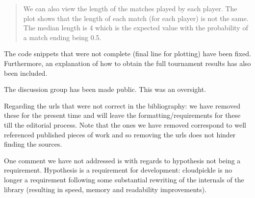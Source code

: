 \documentclass{article}
\begin{document}
\begin{quote}
    We can also view the length of the matches played by each player. The plot
    shows that the length of each match (for each player) is not the same. The
    median length is 4 which is the expected value with the probability of a
    match ending being 0.5.
\end{quote}

The code snippets that were not complete (final line for plotting) have been
fixed. Furthermore, an explanation of how to obtain the full tournament results
has also been included.

The discussion group has been made public. This was an oversight.

Regarding the urls that were not correct in the bibliography: we have removed
these for the present time and will leave the formatting/requirements for these
till the editorial process. Note that the ones we have removed correspond to
well referenced published pieces of work and so removing the urls does not
hinder finding the sources.

One comment we have not addressed is with regards to hypothesis not being a
requirement.
Hypothesis is a requirement for development: cloudpickle is no longer a
requirement following some substantial rewriting of the internals of the
library (resulting in speed, memory and readability improvements).
\end{document}
